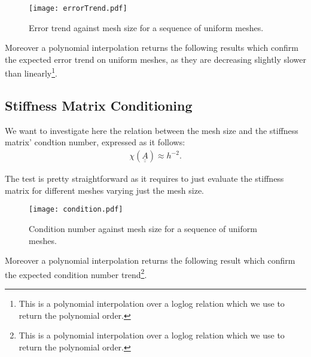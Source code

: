 \begin{figure}[!ht]
	\centering
	\texttt{[image: errorTrend.pdf]}
	\caption{Error trend against mesh size for a sequence of uniform meshes.}
\end{figure}

\newpage
\noindent Moreover a polynomial interpolation returns the following results which confirm the expected error trend on uniform meshes, as they are decreasing slightly slower than linearly\footnote{This is a polynomial interpolation over a loglog relation which we use to return the polynomial order.}.



\newpage
\subsection{Stiffness Matrix Conditioning}

We want to investigate here the relation between the mesh size and the stiffness matrix' condtion number, expressed as it follows:
\begin{gather}
	\chi(\underline{\underline{A}}) \approx h^{-2}.
\end{gather}

The test is pretty straightforward as it requires to just evaluate the stiffness matrix for different meshes varying just the mesh size.

\begin{figure}[!ht]
	\centering
	\texttt{[image: condition.pdf]}
	\caption{Condition number against mesh size for a sequence of uniform meshes.}
\end{figure}

\newpage
\noindent Moreover a polynomial interpolation returns the following result which confirm the expected condition number trend\footnote{This is a polynomial interpolation over a loglog relation which we use to return the polynomial order.}.

